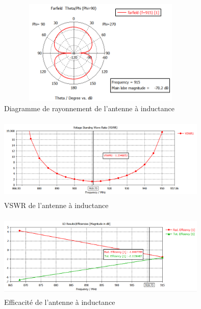 \documentclass[11pt, a4paper, twoside]{book}
\begin{document}
\begin{figure}[H]
\centering
\includegraphics[width=10cm,height=5cm]{clapolfarfield}
\caption{Diagramme de rayonnement de l'antenne à inductance}
\end{figure} 


\begin{figure}[H]
\centering
\includegraphics[width=10cm,height=4cm]{clavswr}
\caption{VSWR de l'antenne à inductance}
\end{figure} 

\begin{figure}[H]
\centering
\includegraphics[width=10cm,height=4cm]{claefficency}
\caption{Efficacité de l'antenne à inductance}
\end{figure} 


\end{document}
